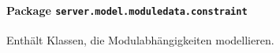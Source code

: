 \FloatBarrier
\paragraph[Package server.model.moduledata.constraint]{Package \texttt{server.model.moduledata.constraint}}
Enthält Klassen, die Modulabhängigkeiten modellieren.
       